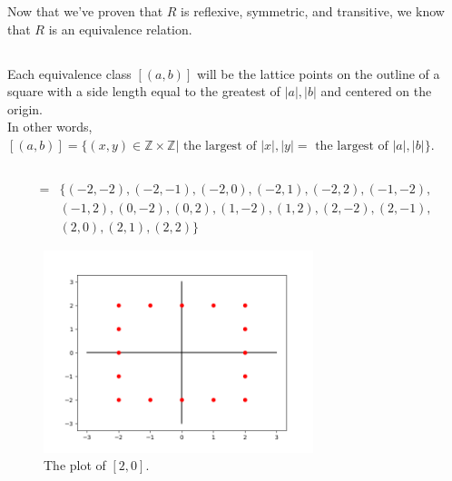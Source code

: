 \documentclass{article}
\begin{document}
Now that we've proven that $R$ is reflexive, symmetric, and transitive, we know that $R$ is an equivalence relation.


\subsection{}
Each equivalence class $[(a,b)]$ will be the lattice points on the outline of a square with a side length equal to the greatest of $|a|,|b|$ and centered on the origin.\\
In other words, $[(a,b)] = \{ (x,y) \in \mathbb{Z} \times \mathbb{Z} | \text{ the largest of } |x|,|y| = \text{ the largest of } |a|,|b| \}$.

\subsection{}
\begin{align*}
    [2,0] = &\{(-2, -2), (-2, -1), (-2, 0), (-2, 1), (-2, 2), (-1, -2),\\
          &(-1, 2), (0, -2), (0, 2), (1, -2), (1, 2), (2, -2), (2, -1),\\
          &(2, 0), (2, 1), (2, 2)\}
\end{align*}
\begin{figure}[hbt!]
    \centering
    \includegraphics[width=0.7\textwidth]{plot.png}
    \caption{The plot of $[2,0]$.}
\end{figure}
\FloatBarrier

\section{}
\end{document}
